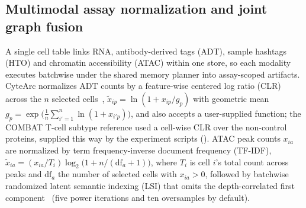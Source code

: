 \documentclass[11pt]{article}
\begin{document}
\subsection*{Multimodal assay normalization and joint graph fusion}\label{sec:Multimodal analysis}

A single cell table links RNA, antibody-derived tags (ADT), sample hashtags (HTO) and chromatin accessibility (ATAC) within one store, so each modality executes batchwise under the shared memory planner into assay-scoped artifacts. CyteArc normalizes ADT counts by a feature-wise centered log ratio (CLR) across the $n$ selected cells~\cite{stoeckius2017simultaneous}, $\tilde x_{ip}=\ln(1+x_{ip}/g_p)$ with geometric mean $g_p=\exp\bigl(\frac{1}{n}\sum_{i'=1}^{n}\ln(1+x_{i'p})\bigr)$, and also accepts a user-supplied function; the COMBAT T-cell subtype reference used a cell-wise CLR over the non-control proteins, supplied this way by the experiment scripts (). ATAC peak counts $x_{ia}$ are normalized by term frequency-inverse document frequency (TF-IDF), $\tilde x_{ia}=(x_{ia}/T_i)\log_{2}\bigl(1+n/(\mathrm{df}_a+1)\bigr)$, where $T_i$ is cell $i$'s total count across peaks and $\mathrm{df}_a$ the number of selected cells with $x_{ia}>0$, followed by batchwise randomized latent semantic indexing (LSI) that omits the depth-correlated first component~\cite{cusanovich2018cisregulatory} (five power iterations and ten oversamples by default).
\end{document}
